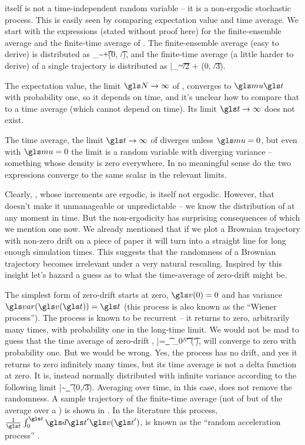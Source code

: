 \BM itself is not a time-independent random variable -- it is a non-ergodic stochastic process. This is easily seen
by comparing expectation value and time average. We start with the expressions (stated without proof here) for the finite-ensemble average and the finite-time average of \BM. The finite-ensemble average (easy to derive) is distributed as
\be
\ave{\gv}_\N \sim \gmu \t+\mN(0, \t/\N),
\ee
and the finite-time average (a little harder to derive) of a single \BM trajectory is distributed as
\be
\bar{\gv}_\t \sim \gmu \t/2 + \gsigma \mN(0, \t/3).
\ee

The expectation value, \ie the limit $\N\to\infty$ of , converges to $\gmu \t$ with probability 
one, so it depends on time, and it's unclear how to compare that to a time average (which cannot depend on time). Its limit $\t\to\infty$ does not exist.

The time average, the limit $\t\to\infty $ of  diverges unless $\gmu=0$, but even with 
$\gmu=0$ the limit is a random variable with diverging variance -- something whose density 
is zero everywhere. In no meaningful sense do the two expressions converge to the same 
scalar in the relevant limits.

Clearly, \BM, whose increments are ergodic, is itself not ergodic. However, that doesn't make it
unmanageable or unpredictable -- we know the distribution of \BM at any moment in time. But the non-ergodicity
has surprising consequences of which we mention one now. We already mentioned
that if we plot a Brownian trajectory with non-zero drift on a piece of paper it will turn into a straight line for long enough
simulation times. This suggests that the randomness of a Brownian trajectory becomes irrelevant
under a very natural rescaling. Inspired by this insight let's hazard a guess as to what 
the time-average of zero-drift \BM might be. 

The simplest form of zero-drift \BM starts at zero, $\gv(0)=0$
and has variance $\var(\gv(\t))=\t$ (this process is also known as the ``Wiener process''). The process is 
known to be recurrent -- it returns to zero, arbitrarily many times, with probability one in the 
long-time limit. We would not be mad to guess that the time average of zero-drift \BM,
\be
\bar{\gv}=\lim_{\t\to\infty} \int_0^\t \gd\t' \gv(\t'),
\ee
will converge to zero with probability one. But we would be wrong. Yes, the process has no drift, and
yes it returns to zero infinitely many times, but its time average is not a delta function at zero.
It is, instead normally distributed with infinite variance according to the following limit
\be
\bar{\gv}\sim \lim_{\t\to\infty} \mN(0,\t/3).
\ee
Averaging over time, in this case, does not remove the randomness. A sample 
trajectory of the finite-time average (not of \BM but of the average over a \BM) is shown in . In the literature this process, 
$\frac{1}{\t}\int_0^\t \gd\t' \gv(\t')$, is known as the ``random acceleration process'' \cite{Burkhardt2007}.

